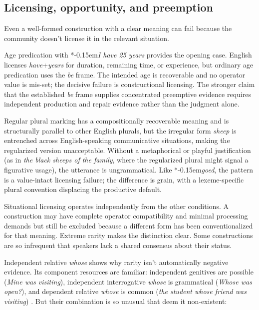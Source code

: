 \documentclass[12pt,letterpaper]{article}
\newcommand{\mention}[1]{\textit{#1}}
\newcommand{\judgesep}{\kern-0.15em}
\newcommand{\ungram}[1]{*\judgesep#1}
\begin{document}
\subsection{Licensing, opportunity, and preemption}

Even a well-formed construction with a clear meaning can fail because the
community doesn't license it in the relevant situation.

Age predication with \ungram{\mention{I have 25 years}} provides the opening
case. English licenses \mention{have}+\mention{years} for duration, remaining
time, or experience, but ordinary age predication uses the \mention{be} frame.
The intended age is recoverable and no operator value is mis-set; the decisive
failure is constructional licensing. The stronger claim that the established
\mention{be} frame supplies concentrated preemptive evidence requires independent
production and repair evidence rather than the judgment alone.

\ea[*]{\mention{We sheared three sheeps.}}\label{ex:sheeps-entrench}
\z

Regular plural marking has a compositionally recoverable meaning and is structurally parallel to other English plurals, but the irregular form \mention{sheep} is entrenched across English-speaking communicative situations, making the regularized version unacceptable. Without a metaphorical or playful justification (as in \mention{the black sheeps of the family}, where the regularized plural might signal a figurative usage), the utterance is ungrammatical.
Like \ungram{\mention{goed}}, the pattern is a value-intact licensing failure; the
difference is grain, with a lexeme-specific plural convention displacing the
productive default.

Situational licensing operates independently from the other conditions. A
construction may have complete operator compatibility and minimal processing
demands but still be excluded because a different form has been conventionalized
for that meaning. Extreme rarity makes the distinction clear. Some constructions
are so infrequent that speakers lack a shared consensus about their status.

Independent relative \mention{whose} shows why rarity isn't automatically
negative evidence. Its component resources are familiar: independent genitives
are possible (\mention{Mine was visiting}), independent interrogative
\mention{whose} is grammatical (\mention{Whose was open?}), and dependent
relative \mention{whose} is common (\mention{the student whose friend was
visiting}) \autocite{hankamer1973whose}. But their combination is so unusual
that \textcite{hankamer1973whose} deem it non-existent:
\end{document}
